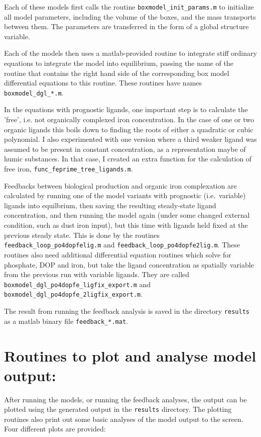 \documentclass[a4paper]{scrartcl}
\begin{document}
Each of these models first calls the routine
\verb+boxmodel_init_params.m+ to initialize all model parameters,
including the volume of the boxes, and the mass transports between
them. The parameters are transferred in the form of a global
structure variable. 

Each of the models then uses a matlab-provided routine to integrate
stiff ordinary equations to integrate the model into equilibrium,
passing the name of the routine that contains the right hand side of
the corresponding box model differential equations to this
routine. These routines have names \verb+boxmodel_dgl_*.m+.

In the equations with prognostic ligands, one important step is to
calculate the 'free', i.e. not organically complexed iron
concentration. In the case of one or two organic ligands this boils
down to finding the roots of either a quadratic or cubic polynomial. I
also experimented with one version where a third weaker ligand was
assumed to be present in constant concentration, as a representation
maybe of humic substances. In that case, I created an extra function
for the calculation of free iron, \verb+func_feprime_tree_ligands.m+. 

Feedbacks between biological production and organic iron complexation
are calculated by running one of the model variants with prognostic
(i.e.\ variable) ligands into equilbrium, then saving the resulting
steady-state ligand concentration, and then running the model again
(under some changed external condition, such as dust iron input), but
this time with ligands held fixed at the previous steady state. This
is done by the routines \verb+feedback_loop_po4dopfelig.m+ and
\verb+feedback_loop_po4dopfe2lig.m+. These routines also need
additional differential equation routines which solve for phosphate,
DOP and iron, but take the ligand concentration as spatially variable
from the previous run with variable ligands. They are called
\verb+boxmodel_dgl_po4dopfe_ligfix_export.m+ and
\verb+boxmodel_dgl_po4dopfe_2ligfix_export.m+.

The result from running the feedback analysis is saved in the
directory \verb+results+ as a matlab binary file
\verb+feedback_*.mat+.

\section{Routines to plot and analyse model output:}

After running the models, or running the feedback analyses, the output
can be plotted using the generated output in the \verb+results+
directory. The plotting routines also print out some basic analyses of
the model output to the screen. Four different plots are provided:
\end{document}
